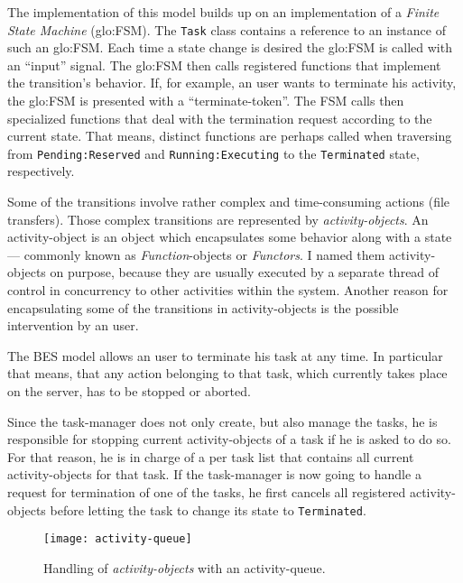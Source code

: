 The  implementation of  this model  builds up  on an  implementation  of a
\emph{Finite  State  Machine}  (\gls{glo:FSM}).  The  \texttt{Task}  class
contains a reference to an instance  of such an \gls{glo:FSM}. Each time a
state  change is  desired the  \gls{glo:FSM} is  called with  an ``input''
signal. The  \gls{glo:FSM} then calls registered  functions that implement
the transition's behavior. If, for example, an user wants to terminate his
activity, the  \gls{glo:FSM} is presented with  a ``terminate-token''. The
FSM  calls  then specialized  functions  that  deal  with the  termination
request according to the current state. That means, distinct functions are
perhaps   called  when   traversing  from   \texttt{Pending:Reserved}  and
\texttt{Running:Executing} to the \texttt{Terminated} state, respectively.

Some of the transitions  involve rather complex and time-consuming actions
(\eg  file  transfers).   Those  complex transitions  are  represented  by
\emph{activity-objects}.    An   activity-object   is  an   object   which
encapsulates  some behavior  along  with  a state  ---  commonly known  as
\emph{Function}-objects or \emph{Functors}.  I named them activity-objects
on  purpose, because they  are usually  executed by  a separate  thread of
control  in concurrency  to other  activities within  the  system. Another
reason for  encapsulating some of  the transitions in  activity-objects is
the possible intervention by an user.

The  BES model  allows an  user to  terminate his  task at  any  time.  In
particular  that means,  that any  action  belonging to  that task,  which
currently takes place on the server, has to be stopped or aborted.

Since the task-manager does not only create, but also manage the tasks, he
is responsible  for stopping current activity-objects  of a task  if he is
asked to do so.  For that reason, he  is in charge of a per task list that
contains all  current activity-objects for that task.  If the task-manager
is now going to  handle a request for termination of one  of the tasks, he
first cancels  all registered activity-objects before letting  the task to
change its state to \texttt{Terminated}.

\begin{figure}[ht]
  \centering
  \texttt{[image: activity-queue]}
  \caption{Handling of \emph{activity-objects} with an activity-queue.}
  \label{fig:activity-queue}
\end{figure}

